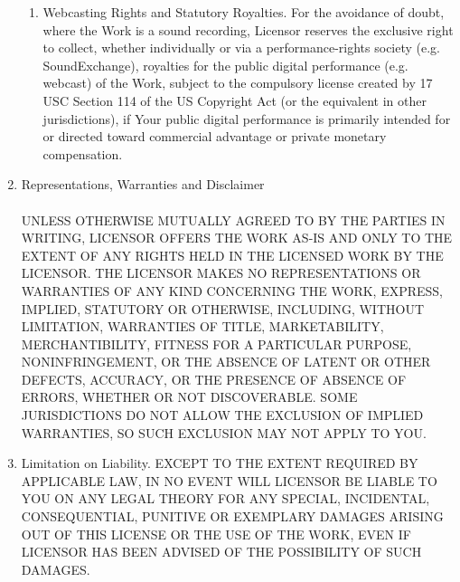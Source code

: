 \begin{enumerate}
\begin{enumerate}
    \item {Webcasting Rights and Statutory Royalties. For the avoidance of
    doubt, where the Work is a sound recording, Licensor reserves the exclusive
    right to collect, whether individually or via a performance-rights society
    (e.g. SoundExchange), royalties for the public digital performance (e.g.
    webcast) of the Work, subject to the compulsory license created by 17 USC
    Section 114 of the US Copyright Act (or the equivalent in other
    jurisdictions), if Your public digital performance is primarily intended for
    or directed toward commercial advantage or private monetary compensation.}
  \end{enumerate}

  \item {Representations, Warranties and Disclaimer}
\\ \\
UNLESS OTHERWISE MUTUALLY AGREED TO BY THE PARTIES IN WRITING, LICENSOR OFFERS
THE WORK AS-IS AND ONLY TO THE EXTENT OF ANY RIGHTS HELD IN THE LICENSED WORK BY
THE LICENSOR. THE LICENSOR MAKES NO REPRESENTATIONS OR WARRANTIES OF ANY KIND
CONCERNING THE WORK, EXPRESS, IMPLIED, STATUTORY OR OTHERWISE, INCLUDING,
WITHOUT LIMITATION, WARRANTIES OF TITLE, MARKETABILITY, MERCHANTIBILITY, FITNESS
FOR A PARTICULAR PURPOSE, NONINFRINGEMENT, OR THE ABSENCE OF LATENT OR OTHER
DEFECTS, ACCURACY, OR THE PRESENCE OF ABSENCE OF ERRORS, WHETHER OR NOT
DISCOVERABLE. SOME JURISDICTIONS DO NOT ALLOW THE EXCLUSION OF IMPLIED
WARRANTIES, SO SUCH EXCLUSION MAY NOT APPLY TO YOU.

  \item {Limitation on Liability. EXCEPT TO THE EXTENT REQUIRED BY APPLICABLE
  LAW, IN NO EVENT WILL LICENSOR BE LIABLE TO YOU ON ANY LEGAL THEORY FOR ANY
  SPECIAL, INCIDENTAL, CONSEQUENTIAL, PUNITIVE OR EXEMPLARY DAMAGES ARISING OUT
  OF THIS LICENSE OR THE USE OF THE WORK, EVEN IF LICENSOR HAS BEEN ADVISED OF
  THE POSSIBILITY OF SUCH DAMAGES.}


\end{enumerate}
